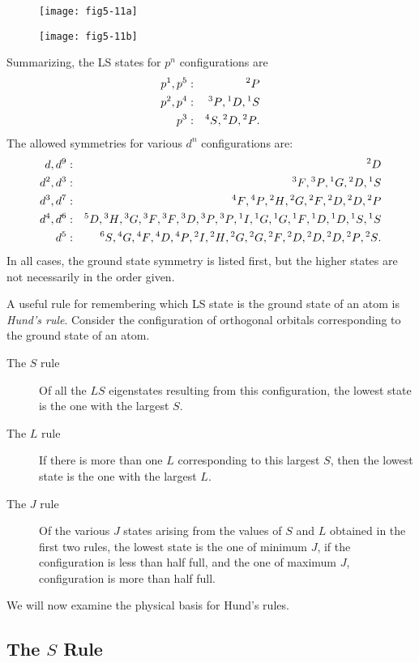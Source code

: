 \begin{figure}
\texttt{[image: fig5-11a]}
\caption{}
\label{fig5-11a}
\end{figure}

\begin{figure}
\texttt{[image: fig5-11b]}
\caption{}
\label{fig5-11b}
\end{figure}

Summarizing, the LS states for $p^n$ configurations are
\begin{eqnarray}
p^1 , p^5 &:& {^2P}\cr
p^2 , p^4 &:& {^3P}, {^1D} , {^1S}\cr
p^3 &:& {^4S}, {^2D}, {^2P}.
\end{eqnarray}
The allowed symmetries for various $d^n$ configurations are:
\begin{eqnarray}
d,d^9 &:& {^2D}\cr
d^2,d^3 &:& {^3F}, {^3P}, {^1G}, {^2D}, {^1S}\cr
d^3, d^7 &:& {^4F}, {^4P}, {^2H}, {^2G}, {^2F}, {^2D}, {^2D}, {^2P}\cr
d^4,d^6 &:& {^5D}, {^3H}, {^3G}, {^3F}, {^3F}, {^3D}, {^3P}, {^3P}, 
{^1I}, {^1G}, {^1G}, {^1F}, {^1D}, {^1D}, {^1S}, {^1S}\cr
d^5 &:& {^6S} , {^4G}, {^4F}, {^4D}, {^4P}, {^2I}, {^2H}, {^2G}, 
{^2G}, {^2F}, {^2D}, {^2D}, {^2D}, {^2P}, {^2S}.
\end{eqnarray}
In all cases, the ground state symmetry is listed first, but the 
higher states are not necessarily in the order given.

A useful rule for remembering which LS state is the ground state of an
atom is \emph{Hund's rule}.  Consider the configuration of orthogonal
orbitals corresponding to the ground state of an atom.
\begin{description}
\item[The $S$ rule] Of all the $LS$ eigenstates resulting from this
configuration, the lowest state is the one with the largest $S$.
\item[The $L$ rule] If there is more than one $L$ corresponding to
this largest $S$, then the lowest state is the one with the largest
$L$.  
\item[The $J$ rule] Of the various $J$ states arising from
the values of $S$ and $L$ obtained in the first two rules, the lowest
state is the one of minimum $J$, if the configuration is less than
half full, and the one of maximum $J$, configuration is more than half
full.
\end{description}

We will now examine the physical basis for Hund's rules.

\subsection{The $S$ Rule}

